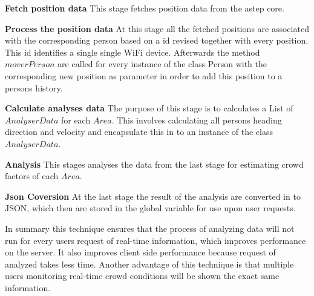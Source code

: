 \begin{enumeration}
    \item \textbf{Fetch position data} This stage fetches position data from the astep core.
    \item \textbf{Process the position data} At this stage all the fetched positions are associated with the corresponding person based on a id revised together with every position. This id identifies a single single WiFi device. Afterwards the method $moverPerson$ are called for every instance of the class Person with the corresponding new position as parameter in order to add this position to a persons history.
    \item \textbf{Calculate analyses data} The purpose of this stage is to calculates a List of $AnalyserData$ for each $Area$. This involves calculating all persons heading direction and velocity and encapsulate this in to an instance of the class $AnalyserData$.
    \item \textbf{Analysis} This stages analyses the data from the last stage for estimating  crowd factors of each $Area$.
    \item \textbf{Json Coversion} At the last stage the result of the analysis are converted in to JSON, which then are stored in the global variable for use upon user requests. 
\end{enumeration}

In summary this technique ensures that the process of analyzing data will not run for every users request of real-time information, which improves performance on the server. It also improves client side performance because request of analyzed takes less time. Another advantage of this technique is that multiple users monitoring real-time crowd conditions will be shown the exact same information.
